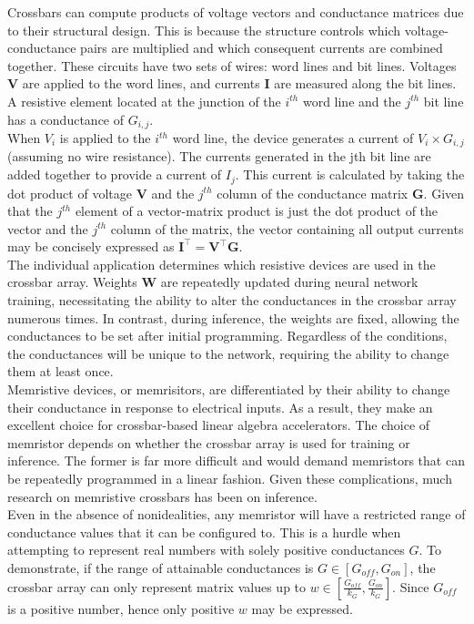 \noindent Crossbars can compute products of voltage vectors and conductance matrices due to their structural design. This is because the structure controls which voltage-conductance pairs are multiplied and which consequent currents are combined together. These circuits have two sets of wires: word lines and bit lines. Voltages $\mathbf{V}$ are applied to the word lines, and currents $\mathbf{I}$ are measured along the bit lines. A resistive element located at the junction of the $i^{th}$ word line and the $j^{th}$ bit line has a conductance of $G_{i,j}$.\\

\noindent When $V_i$ is applied to the $i^{th}$ word line, the device generates a current of $V_i \times G_{i,j}$ (assuming no wire resistance). The currents generated in the jth bit line are added together to provide a current of $I_j$. This current is calculated by taking the dot product of voltage $\mathbf{V}$ and the $j^{th}$ column of the conductance matrix $\mathbf{G}$. Given that the $j^{th}$ element of a vector-matrix product is just the dot product of the vector and the $j^{th}$ column of the matrix, the vector containing all output currents may be concisely expressed as $\mathbf{I}^\intercal = \mathbf{V}^\intercal \mathbf{G}$. \\

\noindent The individual application determines which resistive devices are used in the crossbar array. Weights $\mathbf{W}$ are repeatedly updated during neural network training, necessitating the ability to alter the conductances in the crossbar array numerous times. In contrast, during inference, the weights are fixed, allowing the conductances to be set after initial programming. Regardless of the conditions, the conductances will be unique to the network, requiring the ability to change them at least once. \\

\noindent Memristive devices, or memrisitors, are differentiated by their ability to change their conductance in response to electrical inputs. As a result, they make an excellent choice for crossbar-based linear algebra accelerators. The choice of memristor depends on whether the crossbar array is used for training or inference. The former is far more difficult and would demand memristors that can be repeatedly programmed in a linear fashion. Given these complications, much research on memristive crossbars has been on inference. \\

\noindent Even in the absence of nonidealities, any memristor will have a restricted range of conductance values that it can be configured to. This is a hurdle when attempting to represent real numbers with solely positive conductances $G$. To demonstrate, if the range of attainable conductances is $G \in [G_{off}, G_{on}]$, the crossbar array can only represent matrix values up to $w \in \left [ \frac{G_{off}}{k_G}, \frac{G_{on}}{k_G} \right ]$. Since $G_{off}$ is a positive number, hence only positive $w$ may be expressed. \\

